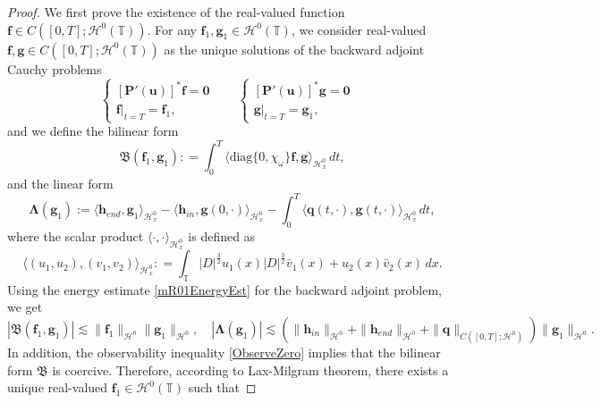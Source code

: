 \documentclass[12pt]{amsart}
\theoremstyle{remark}
\theoremstyle{definition}
\numberwithin{equation}{section}
\renewcommand{\H}{{\mathcal H }}
\newcommand{\f}{\frac}
\newcommand{\T}{{\mathbb T}}
\begin{document}
\begin{proof}
We first prove the existence of the real-valued function $\mathbf{f}\in C([0,T]; \H^0(\T))$.
For any $\mathbf{f}_1, \mathbf{g}_1 \in \H^0(\T)$, we consider real-valued $\mathbf{f}, \mathbf{g} \in C([0,T]; \H^0(\T))$ as the unique solutions of the backward adjoint Cauchy problems
\begin{equation}
\label{mLBackwardAdjoint}
\left\{
\begin{array}{lr}
[\mathbf{P}'(\mathbf{u})]^* \mathbf{f} = \mathbf{0} &  \\
\mathbf{f}|_{t=T} = \mathbf{f}_1,&
\end{array}
\right. \quad
\left\{
\begin{array}{lr}
[\mathbf{P}'(\mathbf{u})]^* \mathbf{g} = \mathbf{0} &  \\
\mathbf{g}|_{t=T} = \mathbf{g}_1,&
\end{array}
\right.
\end{equation}
and we define the bilinear form
\begin{equation*}
    \mathfrak{B}( \mathbf{f}_1,  \mathbf{g}_1) : = \int_0^T \langle \text{diag}\{0, \chi_\omega \}  \mathbf{f},  \mathbf{g}\rangle_{\H^0_x} \,dt,
\end{equation*}
and the linear form
\begin{equation*}
\mathbf{\Lambda}(\mathbf{g}_1) := \langle   \mathbf{h}_{end},  \mathbf{g}_1\rangle_{\H^0_x} - \langle   \mathbf{h}_{in},  \mathbf{g}(0,\cdot)\rangle_{\H^0_x} -\int_0^T \langle   \mathbf{q}(t,\cdot),  \mathbf{g}(t,\cdot)\rangle_{\H^0_x} \,dt,
\end{equation*}
where the scalar product $\langle   \cdot,  \cdot\rangle_{\H^0_x}$ is defined as
\begin{equation*}
\langle  (u_1, u_2),  (v_1, v_2)\rangle_{\H^0_x} : = \int_\T |D|^\f32 u_1(x) |D|^\f32\bar{v}_1(x) + u_2(x)\bar{v}_2(x) \,dx.
\end{equation*}
Using the energy estimate \eqref{mR01EnergyEst} for the backward adjoint problem, we get
\begin{equation*}
|\mathfrak{B}( \mathbf{f}_1,  \mathbf{g}_1)| \lesssim \|\mathbf{f}_1 \|_{\H^0} \|\mathbf{g}_1 \|_{\H^0}, \quad  |\mathbf{\Lambda}(\mathbf{g}_1)| \lesssim \left(\|\mathbf{h}_{in}\|_{\H^0} + \|\mathbf{h}_{end}\|_{\H^0} + \|\mathbf{q}\|_{C([0,T];\H^0)}\right) \| \mathbf{g}_1\|_{\H^0}.
\end{equation*}
In addition, the observability inequality \eqref{ObserveZero} implies that the bilinear form $\mathfrak{B}$ is coercive.
Therefore, according to Lax-Milgram theorem, there exists a unique real-valued $\mathbf{f}_1 \in \H^0(\T)$ such that

\end{proof}
\end{document}
